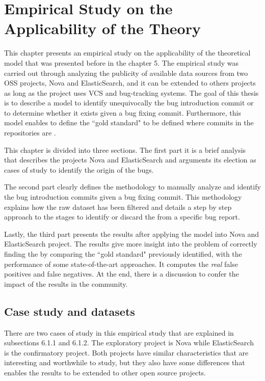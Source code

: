 \documentclass[a4paper, 12pt]{book}
\begin{document}
\cleardoublepage
\chapter{Empirical Study on the Applicability of the Theory}
\label{chap:application}
This chapter presents an empirical study on the applicability of the theoretical model that was presented before in the chapter 5. The empirical study was carried out through analyzing the publicity of available data sources from two OSS projects, Nova and ElasticSearch, and it can be extended to others projects as long as the project uses VCS and bug-tracking systems. The goal of this thesis is to describe a model to identify unequivocally the bug introduction commit or to determine whether it exists given a bug fixing commit. Furthermore, this model enables to define the ``gold standard" to be defined where commits in the repositories are \BIC. 

This chapter is divided into three sections. The first part it is a brief analysis that describes the projects Nova and ElasticSearch and arguments its election as cases of study to identify the origin of the bugs.

The second part clearly defines the methodology to manually analyze and identify the bug introduction commits given a bug fixing commit. This methodology explains how the raw dataset has been filtered and details a step by step approach to the stages to identify or discard the \BIC from a specific bug report.  

Lastly, the third part presents the results after applying the model into Nova and ElasticSearch project. The results give more insight into the problem of correctly finding the \BIC by comparing the ``gold standard" previously identified, with the performance of some state-of-the-art approaches. It computes the \emph{real} false positives and false negatives. At the end, there is a discussion to confer the impact of the results in the community.  

\section{Case study and datasets}
\label{sec:case}
There are two cases of study in this empirical study that are explained in  subsections 6.1.1 and 6.1.2. The exploratory project is Nova while ElasticSearch is the confirmatory project. Both projects have similar characteristics that are interesting and worthwhile to study, but they also have some differences that enables the results to be extended to other open source projects.  
\end{document}
